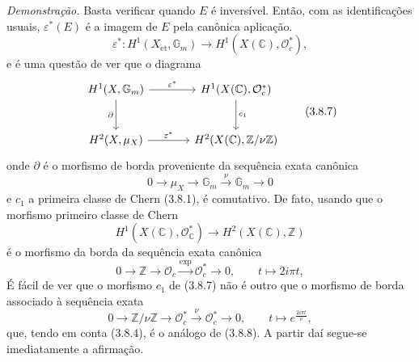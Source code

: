 \emph{Demonstração.} Basta verificar quando $E$ é inversível. Então, com as identificações usuais, $\varepsilon^*(E)$ é a imagem de $E$ pela canônica aplicação.
\[
\varepsilon^*:H^1(X_{\mathrm{\acute et}},\mathbb G_m)\to H^1(X(\mathbb C),\mathcal O_c^*),
\tag{3.8.6}
\]
e é uma questão de ver que o diagrama
\[
\begin{tikzcd}[column sep=large,row sep=large]
H^1(X,\mathbb G_m) \arrow[r,"\varepsilon^*"] \arrow[d,"\partial"'] &
H^1(X(\mathbb C),\mathcal O_c^*) \arrow[d,"c_1"]\\
H^2(X,\mu_X) \arrow[r,"\varepsilon^*"] &
H^2(X(\mathbb C),\mathbb Z/\nu\mathbb Z)
\end{tikzcd}
\tag{3.8.7}
\]
onde $\partial$ é o morfismo de borda proveniente da sequência exata canônica
\[
0\to \mu_X\to\mathbb G_m\xrightarrow{\nu}\mathbb G_m\to0
\tag{3.8.8}
\]
e $c_1$ a primeira classe de Chern (3.8.1), é comutativo. De fato, usando que o morfismo primeiro classe de Chern
\[
H^1(X(\mathbb C),\mathcal O_\mathbb C^*)\to H^2(X(\mathbb C),\mathbb Z)
\]
é o morfismo da borda da sequência exata canônica
\[
0\to\mathbb Z\to\mathcal O_c\xrightarrow{\exp}\mathcal O_c^*\to0,
\qquad
t\mapsto 2i\pi t,
\]
É fácil de ver que o morfismo $c_1$ de (3.8.7) não é outro que o morfismo de borda associado à sequência exata
\[
0\to\mathbb Z/\nu\mathbb Z\to\mathcal O_c^*\xrightarrow{\nu}\mathcal O_c^*\to0,
\qquad
t\mapsto e^{\frac{2i\pi t}{\nu}},
\]
que, tendo em conta (3.8.4), é o análogo de (3.8.8). A partir daí segue-se imediatamente a afirmação.
